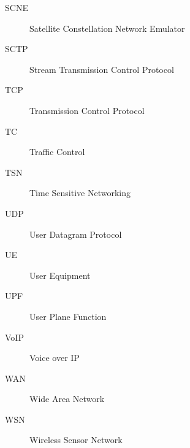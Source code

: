 \begin{description}
\item[SCNE] Satellite Constellation Network Emulator
\item[SCTP] Stream Transmission Control Protocol
\item[TCP] Transmission Control Protocol
\item[TC] Traffic Control
\item[TSN] Time Sensitive Networking
\item[UDP] User Datagram Protocol
\item[UE] User Equipment
\item[UPF] User Plane Function 
\item[VoIP] Voice over IP
\item[WAN] Wide Area Network
\item[WSN] Wireless Sensor Network


\end{description}
